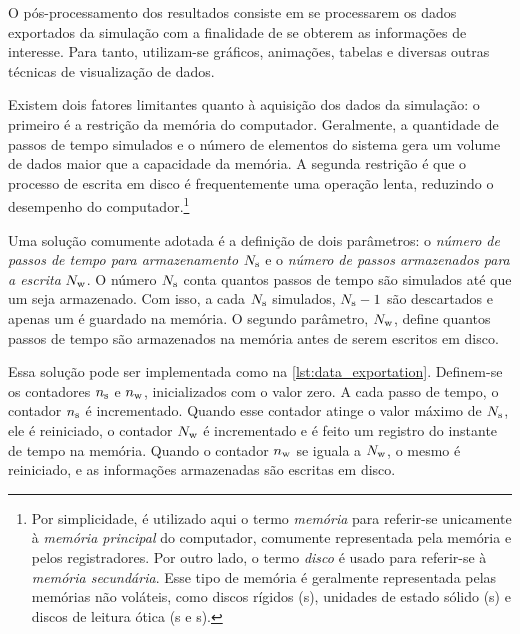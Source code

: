 O pós-processamento dos resultados consiste em se processarem os dados exportados da simulação com a finalidade de se obterem as informações de interesse. Para tanto, utilizam-se gráficos, animações, tabelas e diversas outras técnicas de visualização de dados.

Existem dois fatores limitantes quanto à aquisição dos dados da simulação: o primeiro é a restrição da memória do computador. Geralmente, a quantidade de passos de tempo simulados e o número de elementos do sistema gera um volume de dados maior que a capacidade da memória. A segunda restrição é que o processo de escrita em disco é frequentemente uma operação lenta, reduzindo o desempenho do computador.\footnote{Por simplicidade, é utilizado aqui o termo \textit{memória} para referir-se unicamente à \textit{memória principal} do computador, comumente representada pela memória \RAM{} e pelos registradores. Por outro lado, o termo \textit{disco} é usado para referir-se à \textit{memória secundária}. Esse tipo de memória é geralmente representada pelas memórias não voláteis, como discos rígidos (\HD s), unidades de estado sólido (\SSD s) e discos de leitura ótica (\CD s e \DVD s).}

Uma solução comumente adotada é a definição de dois parâmetros: o \textit{número de passos de tempo para armazenamento} \(N_{\text{s}}\) e o \textit{número de passos armazenados para a escrita} \(N_{\text{w}}\). O número \(N_{\text{s}}\) conta quantos passos de tempo são simulados até que um seja armazenado. Com isso, a cada \(N_{\text{s}}\) simulados, \(N_{\text{s}}-1\) são descartados e apenas um é guardado na memória. O segundo parâmetro, \(N_{\text{w}}\), define quantos passos de tempo são armazenados na memória antes de serem escritos em disco.

Essa solução pode ser implementada como na \cref{lst:data_exportation}. Definem-se os contadores \(n_{\text{s}}\) e \(n_{\text{w}}\), inicializados com o valor zero. A cada passo de tempo, o contador \(n_{\text{s}}\) é incrementado. Quando esse contador atinge o valor máximo de \(N_{\text{s}}\), ele é reiniciado, o contador \(N_{\text{w}}\) é incrementado e é feito um registro do instante de tempo na memória. Quando o contador \(n_{\text{w}}\) se iguala a \(N_{\text{w}}\), o mesmo é reiniciado, e as informações armazenadas são escritas em disco.

